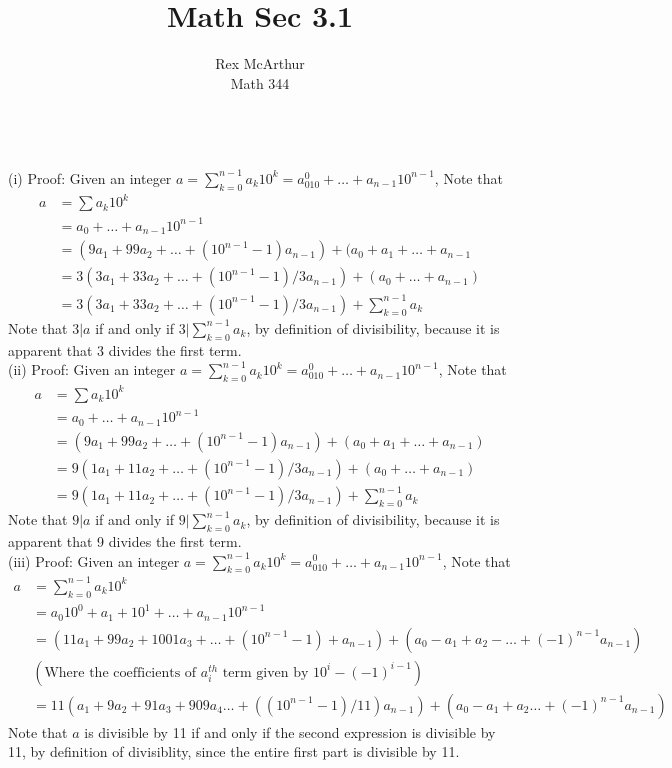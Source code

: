 \documentclass[letterpaper,12pt]{article}
\title{Math Sec 3.1}
\author{Rex McArthur\\Math 344}
\theoremstyle{definition}
\begin{document}
\maketitle
{}\\
(i)
Proof: Given an integer $a = \sum^{n-1}_{k=0} a_k10^k = a_010^0+\dots+
    a_{n-1}10^{n-1}$, Note that\\
        \begin{align*}
            a &= \sum{a_k10^k}\\
            & = a_0+\dots+a_{n-1}10^{n-1}\\
            & = (9a_1 + 99a_2 + \dots +(10^{n-1}-1)a_{n-1}) + (a_0 + a_1 + \dots
                + a_{n-1}\\
            & = 3(3a_1 + 33 a_2 + \dots +  (10^{n-1} -1)/3 a_{n-1}) + 
            (a_0+\dots+a_{n-1})\\
            & = 3(3a_1 + 33 a_2 + \dots +  (10^{n-1} -1)/3 a_{n-1}) + 
            \sum^{n-1}_{k=0} a_k
        \end{align*}
    Note that $3|a$ if and only if $3|\sum^{n-1}_{k=0} a_k$, by definition of 
    divisibility, because it is apparent that 3 divides the first term.\\
(ii)
Proof: Given an integer $a = \sum^{n-1}_{k=0} a_k10^k = a_010^0+\dots+
    a_{n-1}10^{n-1}$, Note that\\
        \begin{align*}
            a &= \sum{a_k10^k}\\
            & = a_0+\dots+a_{n-1}10^{n-1}\\
            & = (9a_1 + 99a_2 + \dots +(10^{n-1}-1)a_{n-1}) + (a_0 + a_1 + \dots
                + a_{n-1})\\
            & = 9(1a_1 + 11 a_2 + \dots +  (10^{n-1} -1)/3 a_{n-1}) + 
            (a_0+\dots+a_{n-1})\\
            & = 9(1a_1 + 11 a_2 + \dots +  (10^{n-1} -1)/3 a_{n-1}) + 
            \sum^{n-1}_{k=0} a_k
        \end{align*}
    Note that $9|a$ if and only if $9|\sum^{n-1}_{k=0} a_k$, by definition of 
    divisibility, because it is apparent that 9 divides the first term.\\
(iii)
Proof: Given an integer $a = \sum^{n-1}_{k=0} a_k10^k = a_010^0+\dots+
    a_{n-1}10^{n-1}$, Note that\\
\begin{align*}
    a &= \sum^{n-1}_{k = 0} a_k 10^k \\
    & = a_0 10^0 + a_1 + 10^1 + \dots + a_{n-1} 10^{n-1}\\
    & = (11a_1 + 99a_2 + 1001a_3 + \dots + (10^{n-1}-1)+a_{n-1}) + (a_0 - a_1 + 
        a_2 - \dots + (-1)^{n-1} a_{n-1})\\
   &(\text{Where the coefficients of $a_i^{th}$ term given by $10^{i}-(-1)^{i-1}$})\\
   & = 11(a_1 + 9a_2+91a_3+909a_4\dots+( (10^{n-1}-1)/11)a_{n-1})+(a_0-a_1+a_2\dots
        +(-1)^{n-1}a_{n-1})
\end{align*}
Note that $a$ is divisible by 11 if and only if the second expression is divisible
by 11, by definition of divisiblity, since the entire first part is divisible by 11.

\\
\end{document}
